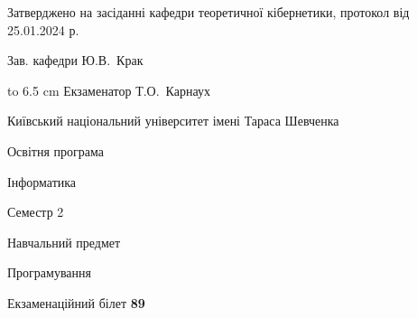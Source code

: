 \documentclass[12pt, ukrainian]{article}
\begin{document}
{\smallskip\smallskip \begin {scriptsize} Затверджено на засіданні кафедри теоретичної кібернетики, протокол   від   25.01.2024 р.\par\smallskip\smallskip\smallskip\smallskip
{\parbox {6.5 cm} {Зав. кафедри \dotfill Ю.В.~Крак}}\hspace {0.7cm} {\hbox to 6.5 cm { Екзаменатор \dotfill Т.О.~Карнаух}} \end{scriptsize}}
\newpage
{{\begin {scriptsize}\par
{ \center  Київський національний університет імені Тараса Шевченка \par}
{\parbox {5 cm}{Освітня програма \hfill}{\parbox {7 cm}{Інформатика\hfill}}\parbox {6 cm}{\hfill Семестр 2}}\par
{\parbox {5 cm} {Навчальний предмет \hfill}\parbox {7 cm}{Програмування \hfill}\parbox {6cm}{\hfill}\par}\vspace{-15pt} \end{scriptsize}}{\center Екзаменаційний білет \No \textbf { 89 }\par}}
\end{document}
